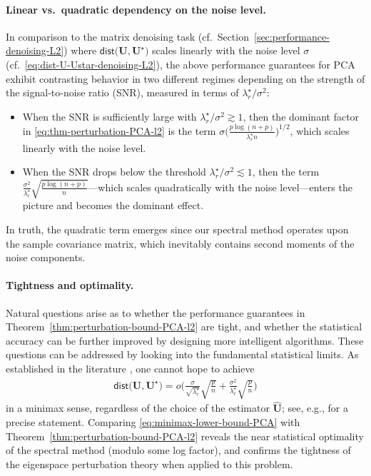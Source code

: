 \paragraph{Linear vs.~quadratic dependency on the noise level.}  In comparison to the matrix denoising task (cf.~Section~\ref{sec:performance-denoising-L2}) where $\mathsf{dist}\big(\bm{U},\bm{U}^{\star}\big)$ scales linearly with the noise level $\sigma$ (cf.~\eqref{eq:dist-U-Ustar-denoising-L2}), the above performance guarantees for PCA exhibit contrasting behavior in two different regimes depending on the strength of the signal-to-noise ratio (SNR), measured in terms of $\lambda_{r}^{\star} / \sigma^2$:
%
\begin{itemize}
\item
	When the SNR is sufficiently large with $\lambda_{r}^{\star} / \sigma^2   \gtrsim 1$,
	then the dominant factor in \eqref{eq:thm-perturbation-PCA-l2} is the term $\sigma \big( {\frac{  p \log(n+p)}{\lambda_{r}^{\star} n}} \big)^{1/2}$, which scales linearly with the noise level.
%
\item
When the SNR drops below the threshold $\lambda_{r}^{\star} / \sigma^2 \lesssim 1$, then  the term $\frac{\sigma^{2}}{\lambda_{r}^{\star}}\sqrt{\frac{p\log(n+p)}{n}} $---which scales quadratically with the noise level---enters the picture and becomes the dominant effect.
%
\end{itemize}
%
In truth, the quadratic term emerges since our spectral method operates upon the sample covariance matrix,  which inevitably contains second moments of the noise components.



\paragraph{Tightness and optimality.} Natural questions arise as to  whether the performance guarantees in Theorem~\ref{thm:perturbation-bound-PCA-l2} are tight,
and whether the statistical accuracy can be further improved by designing more intelligent algorithms. These questions can be addressed by looking into the fundamental statistical limits. As established in the literature \citep{zhang2018heteroskedastic,cai2019subspace}, one cannot hope to achieve
%
\begin{align}
	\mathsf{dist}\big( \widehat{\bm{U}},\bm{U}^{\star}\big)
	=o \Bigg( \frac{\sigma}{\sqrt{\lambda_{r}^{\star}}}\sqrt{\frac{p}{n}}+\frac{\sigma^{2}}{\lambda_{r}^{\star}}\sqrt{\frac{p}{n}} \Bigg)
	\label{eq:minimax-lower-bound-PCA}
\end{align}
%
in a minimax sense, regardless of the choice of the estimator $\widehat{\bm{U}}$; see, e.g., \citet[Theorem 2]{zhang2018heteroskedastic} for a precise statement. Comparing \eqref{eq:minimax-lower-bound-PCA} with Theorem~\ref{thm:perturbation-bound-PCA-l2} reveals the near statistical optimality of the spectral method (modulo some log factor), and  confirms the tightness of the eigenspace perturbation theory when applied to this problem.






